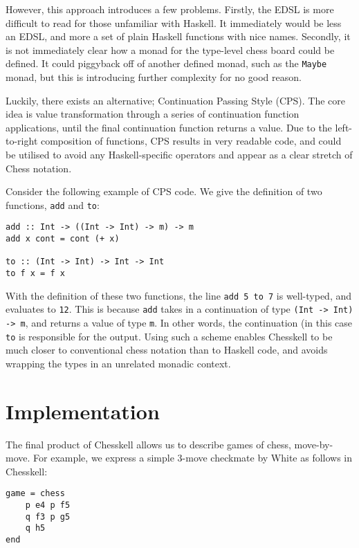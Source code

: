 \documentclass[12pt, a4paper, bibliography=totocnumbered]{scrreprt}
\newcommand{\inline}[1]{\lstinline[basicstyle=\ttfamily\footnotesize]{#1}}
\begin{document}
However, this approach introduces a few problems. Firstly, the EDSL is more difficult to read for those unfamiliar with Haskell. It immediately would be less an EDSL, and more a set of plain Haskell functions with nice names. Secondly, it is not immediately clear how a monad for the type-level chess board could be defined. It could piggyback off of another defined monad, such as the \inline{Maybe} monad, but this is introducing further complexity for no good reason.

Luckily, there exists an alternative; Continuation Passing Style (CPS). The core idea is value transformation through a series of continuation function applications, until the final continuation function returns a value. Due to the left-to-right composition of functions, CPS results in very readable code, and could be utilised to avoid any Haskell-specific operators and appear as a clear stretch of Chess notation.

Consider the following example of CPS code. We give the definition of two functions, \inline{add} and \inline{to}:

\begin{lstlisting}
add :: Int -> ((Int -> Int) -> m) -> m
add x cont = cont (+ x)

to :: (Int -> Int) -> Int -> Int
to f x = f x
\end{lstlisting}

With the definition of these two functions, the line \inline{add 5 to 7} is well-typed, and evaluates to \inline{12}. This is because \inline{add} takes in a continuation of type \inline{(Int -> Int) -> m}, and returns a value of type \inline{m}. In other words, the continuation (in this case \inline{to} is responsible for the output. Using such a scheme enables Chesskell to be much closer to conventional chess notation than to Haskell code, and avoids wrapping the types in an unrelated monadic context.


\chapter{Implementation} \label{examplegame}

The final product of Chesskell allows us to describe games of chess, move-by-move. For example, we express a simple 3-move checkmate by White as follows in Chesskell:

\begin{lstlisting}
game = chess
    p e4 p f5
    q f3 p g5
    q h5
end
\end{lstlisting}
\end{document}
